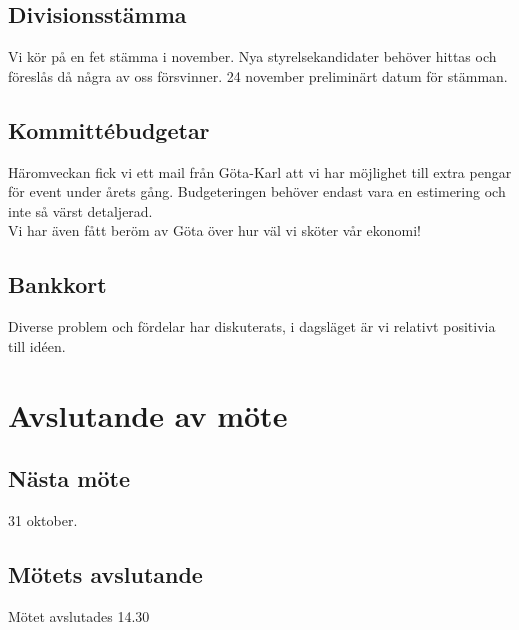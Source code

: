 \documentclass[protokoll]{dvd}
\begin{document}
    \subsection{Divisionsstämma}
    Vi kör på en fet stämma i november. Nya styrelsekandidater behöver hittas och föreslås då några av oss försvinner.
    24 november preliminärt datum för stämman.

    \subsection{Kommittébudgetar}
    Häromveckan fick vi ett mail från Göta-Karl att vi har möjlighet till extra pengar för event under årets gång.
    Budgeteringen behöver endast vara en estimering och inte så värst detaljerad. \\
    Vi har även fått beröm av Göta över hur väl vi sköter vår ekonomi!

    \subsection{Bankkort}
    Diverse problem och fördelar har diskuterats, i dagsläget är vi relativt positivia till idéen.

\section{Avslutande av möte}


\subsection{Nästa möte}

31 oktober.

\subsection{Mötets avslutande}

Mötet avslutades 14.30

\styrelsesignaturer
\end{document}
